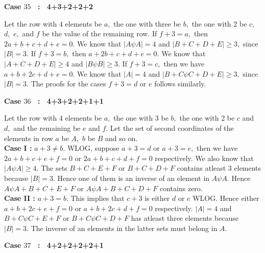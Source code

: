 \documentclass[reqno,10pt]{amsart}
\newtheorem{remar}[prop]{Remark}
\begin{document}
\begin{center}
\textbf{Case $35$ \ : \ 4+3+2+2+2}
\end{center} Let the row with 4 elements be $a,$ the one with three be $b,$ the one with 2 be $c,$ $d,$ $e,$ and $f$ be the value of the remaining row. If $f+3=a,$ then $2a+b+c+d+e=0.$ We know that $|A \psi A|=4$ and $|B+C+D+E| \geq 3,$  since $|B| =3.$  If $f+3=b,$ then $a+2b+c+d+e=0.$  We know that $|A+C+D+E| \geq 4$ and $|B\psi B| \geq 3.$  If $f+3=c,$ then we have $a+b+2c+d+e=0.$ We know that $|A| = 4$ and $|B+C \psi C+D+E| \geq 3,$ since $|B| =3.$  The proofs for the cases $f+3 = d$ or $e$ follows similarly.
\begin{center}
\textbf{Case  $36$ \ : \ 4+3+2+2+1+1}
\end{center}
Let the row with 4 elements be $a,$ the one with 3 be $b,$ the one with 2 be $c$ and $d,$ and the remaining be $e$ and $f.$ Let the set of second coordinates of the elements in row $a$ be $A,$ $b$ be $B$ and so on.\\
\textbf{Case I : } $a+3\neq b.$ WLOG, suppose $a+3=d$ or $a+3=e,$ then we have $2a+b+c+e+f=0$ or $2a+b+c+d+f=0$ respectively. We also know that $|A \psi A| \geq 4.$ The sets $B+C+E+F$ or $B+C+D+F$ contains atleast 3 elements because $|B| =3.$ Hence one of them is an inverse of an element in $A \psi A.$ Hence $A \psi A+B+C+E+F$ or $A \psi A+B+C+D+F$ contains zero.\\
\textbf{Case II :} $a+3=b.$ 
This implies that $c+3$ is either $d$ or $e$ WLOG. Hence either $a+b+2c+e+f=0$ or $a+b+2c+d+f=0$ respectively. $|A|=4$ and $B+C \psi C+E+F$ or $B+C \psi C+D+F$ has atleast three elements because $|B|=3.$ The inverse of an elements in the latter sets must belong in $A.$ 
\newpage 
\begin{center}
\textbf{Case $37$ \ : \ 4+2+2+2+2+1}
\end{center}
\end{document}

